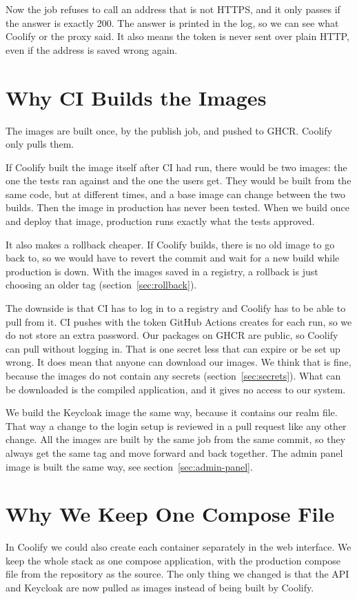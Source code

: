 \documentclass[a4paper,11pt]{article}
\begin{document}
Now the job refuses to call an address that is not HTTPS, and it only passes if the answer is exactly 200. The answer is printed in the log, so we can see what Coolify or the proxy said. It also means the token is never sent over plain HTTP, even if the address is saved wrong again.

\section{Why CI Builds the Images}\label{sec:ci-builds}
The images are built once, by the publish job, and pushed to GHCR. Coolify only pulls them.

If Coolify built the image itself after CI had run, there would be two images: the one the tests ran against and the one the users get. They would be built from the same code, but at different times, and a base image can change between the two builds. Then the image in production has never been tested. When we build once and deploy that image, production runs exactly what the tests approved.

It also makes a rollback cheaper. If Coolify builds, there is no old image to go back to, so we would have to revert the commit and wait for a new build while production is down. With the images saved in a registry, a rollback is just choosing an older tag (section~\ref{sec:rollback}).

The downside is that CI has to log in to a registry and Coolify has to be able to pull from it. CI pushes with the token GitHub Actions creates for each run, so we do not store an extra password. Our packages on GHCR are public, so Coolify can pull without logging in. That is one secret less that can expire or be set up wrong. It does mean that anyone can download our images. We think that is fine, because the images do not contain any secrets (section~\ref{sec:secrets}). What can be downloaded is the compiled application, and it gives no access to our system.

We build the Keycloak image the same way, because it contains our realm file. That way a change to the login setup is reviewed in a pull request like any other change. All the images are built by the same job from the same commit, so they always get the same tag and move forward and back together. The admin panel image is built the same way, see section~\ref{sec:admin-panel}.

\section{Why We Keep One Compose File}
In Coolify we could also create each container separately in the web interface. We keep the whole stack as one compose application, with the production compose file from the repository as the source. The only thing we changed is that the API and Keycloak are now pulled as images instead of being built by Coolify.
\end{document}
